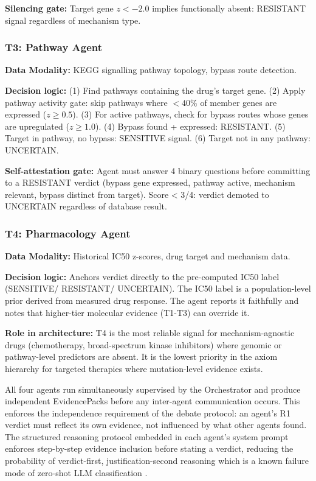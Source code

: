\documentclass{article}
\begin{document}
\noindent\textbf{Silencing gate:} Target gene $z < -2.0$  implies functionally absent: RESISTANT signal regardless of mechanism type.

\subsubsection{T3: Pathway Agent}
\textbf{Data Modality:} KEGG signalling pathway topology, bypass route detection.

\noindent\textbf{Decision logic:} (1) Find pathways containing the drug's target gene. (2) Apply pathway activity gate: skip pathways where $<40\%$ of member genes are expressed ($z \geq 0.5$). (3) For active pathways, check for bypass routes whose genes are upregulated ($z \geq 1.0$). (4) Bypass found + expressed: RESISTANT. (5) Target in pathway, no bypass: SENSITIVE signal. (6) Target not in any pathway: UNCERTAIN.

\noindent\textbf{Self-attestation gate:} Agent must answer 4 binary questions before committing to a RESISTANT verdict (bypass gene expressed, pathway active, mechanism relevant, bypass distinct from target). Score < 3/4: verdict demoted to UNCERTAIN regardless of database result.

\subsubsection{T4: Pharmacology Agent}
\textbf{Data Modality:} Historical IC50 z-scores, drug target and mechanism data.

\noindent\textbf{Decision logic:} Anchors verdict directly to the pre-computed IC50 label (SENSITIVE/ RESISTANT/ UNCERTAIN). The IC50 label is a population-level prior derived from measured drug response. The agent reports it faithfully and notes that higher-tier molecular evidence (T1-T3) can override it.

\noindent\textbf{Role in architecture:} T4 is the most reliable signal for mechanism-agnostic drugs (chemotherapy, broad-spectrum kinase inhibitors) where genomic or pathway-level predictors are absent. It is the lowest priority in the axiom hierarchy for targeted therapies where mutation-level evidence exists.

\vspace{2em}

\noindent All four agents run simultaneously supervised by the Orchestrator and produce independent EvidencePacks before any inter-agent communication occurs. This enforces the independence requirement of the debate protocol: an agent's R1 verdict must reflect its own evidence, not influenced by what other agents found. The structured reasoning protocol embedded in each agent's system prompt enforces step-by-step evidence inclusion before stating a verdict, reducing the probability of verdict-first, justification-second reasoning which is a known failure mode of zero-shot LLM classification \cite{turpin2023language, meng2024application}.
\end{document}
